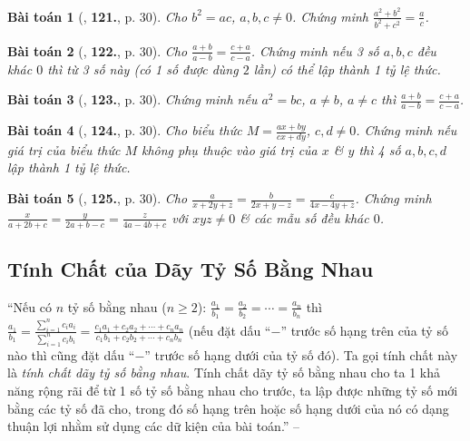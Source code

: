 \documentclass{article}
\numberwithin{equation}{section}
\newtheorem{baitoan}{Bài toán}
\begin{document}
\begin{baitoan}[\cite{Tuyen_Toan_7}, \textbf{121.}, p. 30]
	Cho $b^2 = ac$, $a,b,c\ne 0$. Chứng minh $\frac{a^2 + b^2}{b^2 + c^2} = \frac{a}{c}$.
\end{baitoan}

\begin{baitoan}[\cite{Tuyen_Toan_7}, \textbf{122.}, p. 30]
	Cho $\frac{a + b}{a - b} = \frac{c + a}{c - a}$. Chứng minh nếu 3 số $a,b,c$ đều khác $0$ thì từ 3 số này (có 1 số được dùng $2$ lần) có thể lập thành 1 tỷ lệ thức.
\end{baitoan}

\begin{baitoan}[\cite{Tuyen_Toan_7}, \textbf{123.}, p. 30]
	Chứng minh nếu $a^2 = bc$, $a\ne b$, $a\ne c$ thì $\frac{a + b}{a - b} = \frac{c + a}{c - a}$.
\end{baitoan}

\begin{baitoan}[\cite{Tuyen_Toan_7}, \textbf{124.}, p. 30]
	Cho biểu thức $M = \frac{ax + by}{cx + dy}$, $c,d\ne 0$. Chứng minh nếu giá trị của biểu thức $M$ không phụ thuộc vào giá trị của $x$ \& $y$ thì 4 số $a,b,c,d$ lập thành 1 tỷ lệ thức.
\end{baitoan}

\begin{baitoan}[\cite{Tuyen_Toan_7}, \textbf{125.}, p. 30]
	Cho $\frac{a}{x + 2y + z} = \frac{b}{2x + y - z} = \frac{c}{4x - 4y + z}$. Chứng minh $\frac{x}{a + 2b + c} = \frac{y}{2a + b - c} = \frac{z}{4a - 4b + c}$ với $xyz\ne 0$ \& các mẫu số đều khác $0$.
\end{baitoan}


\subsection{Tính Chất của Dãy Tỷ Số Bằng Nhau}
``Nếu có $n$ tỷ số bằng nhau ($n\ge 2$): $\frac{a_1}{b_1} = \frac{a_2}{b_2} = \cdots = \frac{a_n}{b_n}$ thì $\frac{a_1}{b_1} = \frac{\sum_{i=1}^n c_ia_i}{\sum_{i=1}^n c_ib_i} = \frac{c_1a_1 + c_2a_2 + \cdots + c_na_n}{c_1b_1 + c_2b_2 + \cdots + c_nb_n}$ (nếu đặt dấu ``$-$'' trước số hạng trên của tỷ số nào thì cũng đặt dấu ``$-$'' trước số hạng dưới của tỷ số đó). Ta gọi tính chất này là \textit{tính chất dãy tỷ số bằng nhau}. Tính chất dãy tỷ số bằng nhau cho ta 1 khả năng rộng rãi để từ 1 số tỷ số bằng nhau cho trước, ta lập được những tỷ số mới bằng các tỷ số đã cho, trong đó số hạng trên hoặc số hạng dưới của nó có dạng thuận lợi nhằm sử dụng các dữ kiện của bài toán.'' -- \cite[\S5]{Binh_Toan_7_tap_1}
\end{document}
